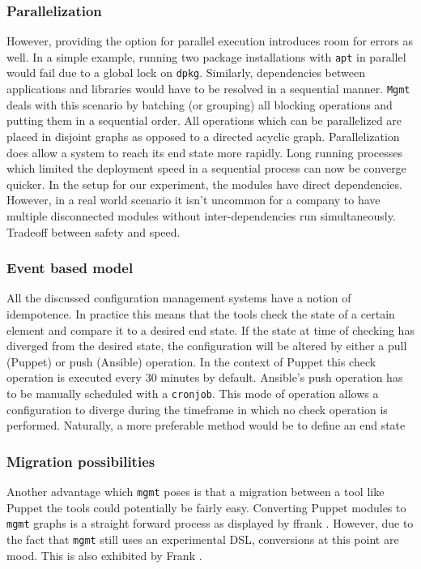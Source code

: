 \subsubsection{Parallelization}
However, providing the option for parallel execution introduces room for errors as well. In a simple example, running two package installations with \texttt{apt} in parallel would fail due to a global lock on \texttt{dpkg}. Similarly, dependencies between applications and libraries would have to be resolved in a sequential manner. \texttt{Mgmt} deals with this scenario by batching (or grouping) all blocking operations and putting them in a sequential order. All operations which can be parallelized are placed in disjoint graphs as opposed to a directed acyclic graph. Parallelization does allow a system to reach its end state more rapidly. Long running processes which limited the deployment speed in a sequential process can now be converge quicker. In the setup for our experiment, the modules have direct dependencies. However, in a real world scenario it isn't uncommon for a company to have multiple disconnected modules without inter-dependencies run simultaneously. Tradeoff between safety and speed. 

\subsubsection{Event based model}
All the discussed configuration management systems have a notion of idempotence. In practice this means that the tools check the state of a certain element and compare it to a desired end state. If the state at time of checking has diverged from the desired state, the configuration will be altered by either a pull (Puppet) or push (Ansible) operation. In the context of Puppet this check operation is executed every 30 minutes by default. Ansible's push operation has to be manually scheduled with a \texttt{cronjob}. This mode of operation allows a configuration to diverge during the timeframe in which no check operation is performed. Naturally, a more preferable method would be to define an end state 

\subsubsection{Migration possibilities}
Another advantage which \texttt{mgmt} poses is that a migration between a tool like Puppet the tools could potentially be fairly easy. Converting Puppet modules to \texttt{mgmt} graphs is a straight forward process as displayed by ffrank \cite{}. However, due to the fact that \texttt{mgmt} still uses an experimental DSL, conversions at this point are mood. This is also exhibited by Frank \cite{}. 
